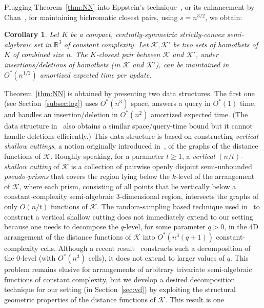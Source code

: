 \documentclass[11pt]{article}
\def\reals{{\mathbb R}}
\def\K{\mathcal{K}}
\newtheorem{corollary}[theorem]{Corollary}
\theoremstyle{definition}
\begin{document}
Plugging Theorem~\ref{thm:NN} into Eppstein's technique~\cite{Epp}, or its enhancement by Chan~\cite{Chan:bcp},
for maintaining bichromatic closest pairs, using $s=n^{3/2}$, we obtain:
\begin{corollary}
	\label{cor:bcp}
Let $K$ be a compact, centrally-symmetric strictly-convex semi-algebraic set
in $\reals^3$ of constant complexity. Let $\K, \K'$ be two sets of homothets of $K$
of combined size $n$. The $K$-closest pair between $\K$ and $\K'$,
under insertions/deletions of homothets (in $\K$ and $\K'$), can be 
maintained in $O^*(n^{1/2})$ amortized expected time per update.
\end{corollary}
%
Theorem~\ref{thm:NN} is obtained by presenting two data structures. The first 
one (see Section~\ref{subsec:log})
uses $O^*(n^3)$ space, answers a query in $O^*(1)$ time, and handles an insertion/deletion in $O^*(n^2)$ amortized expected time. 
(The data structure in~\cite{AES:vd} also obtains a similar space/query-time bound but it cannot handle deletions efficiently.)
This data structure is based on constructing \emph{vertical shallow cuttings}, a notion originally introduced in~\cite{CT16,Chan:le},  of the graphs of the distance functions of $\K$. Roughly speaking,
for a parameter $t\ge 1$, a \emph{vertical $(n/t)$-shallow 
cutting} of $\K$ is a collection of pairwise openly disjoint semi-unbounded \emph{pseudo-prisms} 
that covers the region lying below the $k$-level of 
the arrangement of $\K$, where
each prism, consisting of all points that lie 
vertically below a constant-complexity semi-algebraic 
$3$-dimensional region, intersects the graphs of only $O(n/t)$ functions of $\K$.
The random-sampling based technique used in~\cite{Chan:le,KMRSS} to construct a vertical shallow cutting 
does not immediately extend to our setting because one 
needs to decompose the $q$-level, for some parameter $q>0$, in the 
4D arrangement of the distance functions of $\K$ 
into $O^*(n^3(q+1))$ constant-complexity cells. Although a recent 
result~\cite{AES:vd} constructs such a decomposition of the $0$-level (with $O^*(n^3)$ cells), it does not 
extend to larger values of $q$.
This problem remains elusive for arrangements of arbitrary trivariate semi-algebraic functions of constant complexity, 
but we develop a desired decomposition technique for our setting
(in Section~\ref{sec:vd}) by exploiting the 
structural geometric properties of the distance functions of $\K$. This result is one 
\end{document}
